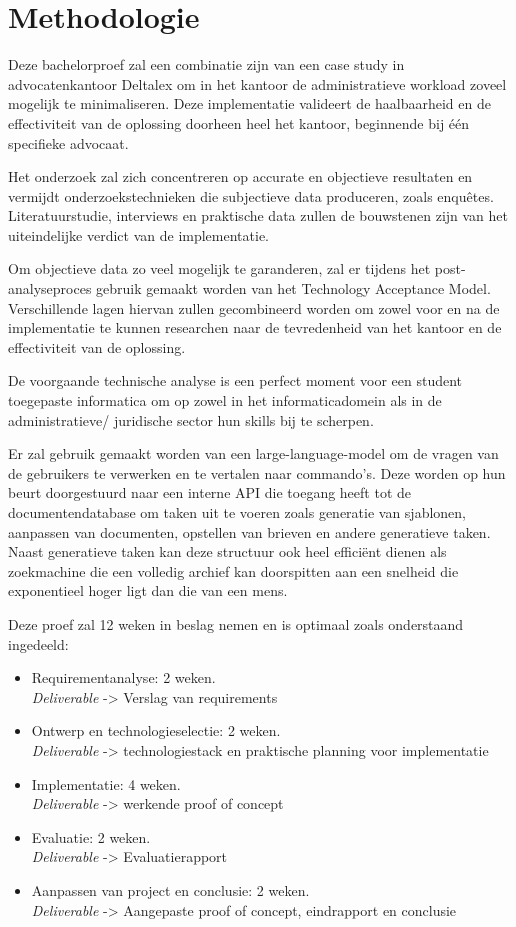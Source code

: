 \section{Methodologie}%
\label{sec:methodologie}
Deze bachelorproef zal een combinatie zijn van een case study in advocatenkantoor Deltalex om in het kantoor de administratieve workload zoveel mogelijk te minimaliseren. Deze implementatie valideert de haalbaarheid en de effectiviteit van de oplossing doorheen heel het kantoor, beginnende bij één specifieke advocaat.

Het onderzoek zal zich concentreren op accurate en objectieve resultaten en vermijdt onderzoekstechnieken die subjectieve data produceren, zoals enquêtes. Literatuurstudie, interviews en praktische data zullen de bouwstenen zijn van het uiteindelijke verdict van de implementatie.

Om objectieve data zo veel mogelijk te garanderen, zal er tijdens het post-analyseproces gebruik gemaakt worden van het Technology Acceptance Model. Verschillende lagen hiervan zullen gecombineerd worden om zowel voor en na de implementatie te kunnen researchen naar de tevredenheid van het kantoor en de effectiviteit van de oplossing. 

De voorgaande technische analyse is een perfect moment voor een student toegepaste informatica om op zowel in het informaticadomein als in de administratieve/ juridische sector hun skills bij te scherpen.

Er zal gebruik gemaakt worden van een large-language-model om de vragen van de gebruikers te verwerken en te vertalen naar commando's. Deze worden op hun beurt doorgestuurd naar een interne API die toegang heeft tot de documentendatabase om taken uit te voeren zoals generatie van sjablonen, aanpassen van documenten, opstellen van brieven en andere generatieve taken. Naast generatieve taken kan deze structuur ook heel efficiënt dienen als zoekmachine die een volledig archief kan doorspitten aan een snelheid die exponentieel hoger ligt dan die van een mens.

Deze proef zal 12 weken in beslag nemen en is optimaal zoals onderstaand ingedeeld:
\begin{itemize}
	\item Requirementanalyse: 2 weken.\\ \emph{Deliverable} -> Verslag van requirements
	\item Ontwerp en technologieselectie: 2 weken.\\ \emph{Deliverable} -> technologiestack en praktische planning voor implementatie
	\item Implementatie: 4 weken.\\ \emph{Deliverable} -> werkende proof of concept
	\item Evaluatie: 2 weken. \\ \emph{Deliverable} -> Evaluatierapport
	\item Aanpassen van project en conclusie: 2 weken.\\ \emph{Deliverable} -> Aangepaste proof of concept, eindrapport en conclusie
\end{itemize}


